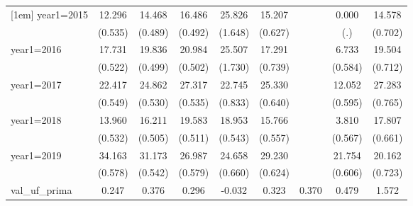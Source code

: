 \begin{table}[htbp]
\begin{tabular}{l*{8}{c}}
[1em]
year1=2015          &      12.296\sym{***}&      14.468\sym{***}&      16.486\sym{***}&      25.826\sym{***}&      15.207\sym{***}&                     &       0.000         &      14.578\sym{***}\\
                    &     (0.535)         &     (0.489)         &     (0.492)         &     (1.648)         &     (0.627)         &                     &         (.)         &     (0.702)         \\
[1em]
year1=2016          &      17.731\sym{***}&      19.836\sym{***}&      20.984\sym{***}&      25.507\sym{***}&      17.291\sym{***}&                     &       6.733\sym{***}&      19.504\sym{***}\\
                    &     (0.522)         &     (0.499)         &     (0.502)         &     (1.730)         &     (0.739)         &                     &     (0.584)         &     (0.712)         \\
[1em]
year1=2017          &      22.417\sym{***}&      24.862\sym{***}&      27.317\sym{***}&      22.745\sym{***}&      25.330\sym{***}&                     &      12.052\sym{***}&      27.283\sym{***}\\
                    &     (0.549)         &     (0.530)         &     (0.535)         &     (0.833)         &     (0.640)         &                     &     (0.595)         &     (0.765)         \\
[1em]
year1=2018          &      13.960\sym{***}&      16.211\sym{***}&      19.583\sym{***}&      18.953\sym{***}&      15.766\sym{***}&                     &       3.810\sym{***}&      17.807\sym{***}\\
                    &     (0.532)         &     (0.505)         &     (0.511)         &     (0.543)         &     (0.557)         &                     &     (0.567)         &     (0.661)         \\
[1em]
year1=2019          &      34.163\sym{***}&      31.173\sym{***}&      26.987\sym{***}&      24.658\sym{***}&      29.230\sym{***}&                     &      21.754\sym{***}&      20.162\sym{***}\\
                    &     (0.578)         &     (0.542)         &     (0.579)         &     (0.660)         &     (0.624)         &                     &     (0.606)         &     (0.723)         \\
[1em]
val\_uf\_prima        &       0.247\sym{***}&       0.376\sym{***}&       0.296\sym{***}&      -0.032         &       0.323\sym{***}&       0.370\sym{***}&       0.479\sym{***}&       1.572\sym{***}\\

\end{tabular}
\end{table}

